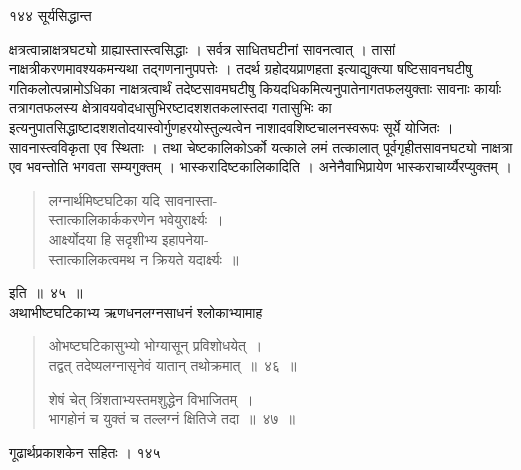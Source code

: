 \documentclass[11pt, openany]{book}
\begin{document}
\noindent १४४ \hspace{4cm} सूर्यसिद्धान्त 
\vspace{1cm}

\begin{sloppypar}
\noindent क्षत्रत्वान्नाक्षत्रघट्यो ग्राह्यास्तास्त्वसिद्धाः । सर्वत्र साधितघटीनां सावनत्वात् । तासां नाक्षत्रीकरणमावश्यकमन्यथा तद्गणनानुपपत्तेः । तदर्थ ग्रहोदयप्राणहता इत्याद्युक्त्या षष्टिसावनघटीषु गतिकलोत्पन्नामोऽधिका नाक्षत्रत्वार्थं तदेष्टसावमघटीषु कियदधिकमित्यनुपातेनागतफलयुक्ताः सावनाः कार्याः तत्रागतफलस्य क्षेत्रावयवोदधासुभिरष्टादशशतकलास्तदा गतासुभिः का इत्यनुपातसिद्धाष्टादशशतोदयास्वोर्गुणहरयोस्तुल्यत्वेन नाशादवशिष्टचालनस्वरूपः सूर्ये योजितः । सावनास्त्वविकृता एव स्थिताः । तथा चेष्टकालिकोऽर्को यत्काले लमं तत्कालात् पूर्वगृहीतसावनघट्यो नाक्षत्रा एव भवन्तोति भगवता सम्यगुक्तम् । भास्करादिष्टकालिकादिति । अनेनैवाभिप्रायेण भास्कराचार्य्यैरप्युक्तम् ।
\end{sloppypar}


\begin{quote}
 {\qt लग्नार्थमिष्टघटिका यदि सावनास्ता-\\
स्तात्कालिकार्ककरणेन भवेयुरार्क्ष्यः~।\\
 आर्क्ष्योदया हि सदृशीभ्य इहापनेया-\\
स्तात्कालिकत्वमथ न क्रियते यदार्क्ष्यः~॥}
\end{quote}

 इति~॥~४५~॥\\
 अथाभीष्टघटिकाभ्य ऋणधनलग्नसाधनं श्लोकाभ्यामाह\textendash


\begin{quote}
 {\ssi ओभष्टघटिकासुभ्यो भोग्यासून् प्रविशोधयेत्~।\\
 तद्वत् तदेष्यलग्नासृनेवं यातान् तथोक्रमात्~॥~४६~॥
 
 शेषं चेत् त्रिंशताभ्यस्तमशुद्धेन विभाजितम्~।\\
 भागहोनं च युक्तं च तल्लग्नं क्षितिजे तदा~॥~४७~॥ }
\end{quote} 

\newpage


 \hspace{3cm} गूढार्थप्रकाशकेन सहितः । \hfill १४५
\vspace{1cm}
\end{document}

